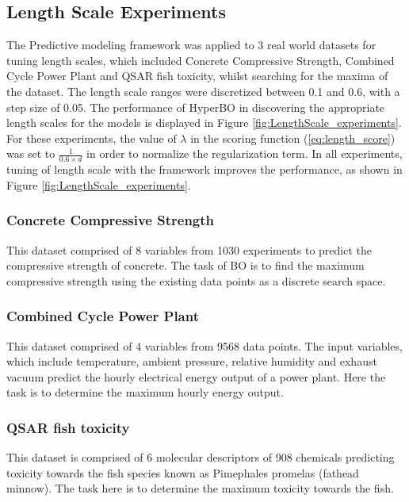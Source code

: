 \documentclass{article}
\begin{document}
\subsection{Length Scale Experiments}
The Predictive modeling framework was applied to 3 real world datasets for tuning length scales, which included Concrete Compressive Strength, Combined Cycle Power Plant and QSAR fish toxicity, whilst searching for the maxima of the dataset. The length scale ranges were discretized between 0.1 and 0.6, with a step size of 0.05.  The performance of HyperBO in discovering the appropriate length scales for the models is displayed in Figure \ref{fig:LengthScale_experiments}. For these  experiments, the value of $\lambda$ in the scoring function (\ref{eq:length_score}) was set to $\frac{1}{ 0.6 \times d}$ in order to normalize the regularization term. In all experiments, tuning of length scale with the framework improves the performance, as shown in Figure \ref{fig:LengthScale_experiments}.

\subsubsection{Concrete Compressive Strength}
This dataset comprised of 8 variables from 1030 experiments to predict the compressive strength of concrete. The task of BO is to find the maximum compressive strength using the existing data points as a discrete search space.

\subsubsection{Combined Cycle Power Plant}
This dataset comprised of 4 variables from 9568 data points. The input variables, which include temperature, ambient pressure, relative humidity and exhaust vacuum predict  the hourly electrical energy output of a power plant. Here the task is to determine the maximum hourly energy output.

\subsubsection{QSAR fish toxicity}
This dataset is comprised of 6 molecular descriptors of 908 chemicals predicting toxicity towards the fish species known as Pimephales promelas (fathead minnow). The task here is to determine the maximum toxicity towards the fish.
\end{document}
